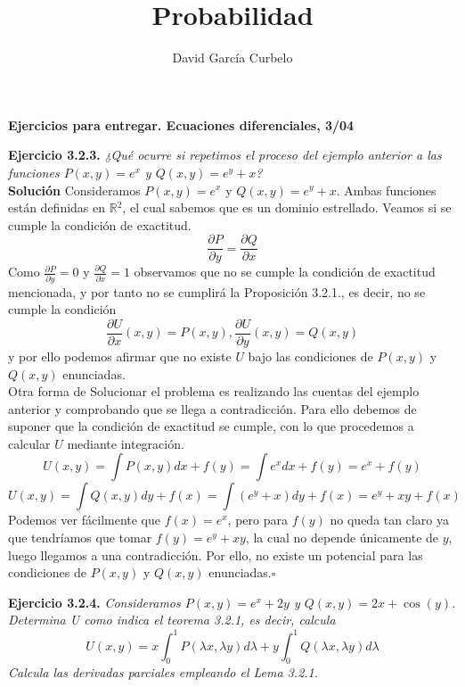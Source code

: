 \documentclass[fleqn]{article}
\author{David García Curbelo}
\title{Probabilidad}
\newcommand*{\QED}{\hfill\ensuremath{\square}}
\def\R{$\mathds{R}$}
\def\sup{$^2$}
\begin{document}
    \begin{center}
        {\large\bf{Ejercicios para entregar. Ecuaciones diferenciales, 3/04}} \\
        
    \end{center}
    
    {\bf{Ejercicio 3.2.3.}} \textit{¿Qué ocurre si repetimos el proceso del ejemplo anterior a las funciones $P(x,y)=e^x$ y $Q(x,y)=e^y + x $?}\\
    
    {\bf{Solución}}  Consideramos $P(x,y)=e^x$ y $Q(x,y)=e^y + x $. Ambas funciones están definidas en \R\sup, el cual sabemos que es un dominio estrellado.
    Veamos si se cumple la condición de exactitud.
    $$\frac{\partial P}{\partial y}=\frac{\partial Q}{\partial x}$$
    Como $\frac{\partial P}{\partial y}=0$ y $\frac{\partial Q}{\partial x}=1$ observamos que no se cumple la condición de exactitud mencionada, 
    y por tanto no se cumplirá la Proposición 3.2.1., es decir, no se cumple la condición
    $$\frac{\partial U}{\partial x}(x,y)=P(x,y), \frac{\partial U}{\partial y}(x,y)=Q(x,y)$$
    y por ello podemos afirmar que no existe $U$ bajo las condiciones de $P(x,y)$ y $Q(x,y)$ enunciadas.\\
    
    Otra forma de Solucionar el problema es realizando las cuentas del ejemplo anterior y comprobando que se llega a contradicción. Para ello debemos de suponer
    que la condición de exactitud se cumple, con lo que procedemos a calcular $U$ mediante integración.
    $$U(x,y)=\int P(x,y) dx + f(y) = \int e^x dx + f(y) = e^x + f(y)$$
    $$U(x,y)=\int Q(x,y) dy + f(x) = \int (e^y + x)dy + f(x) = e^y + xy + f(x)$$
    Podemos ver fácilmente que $f(x)=e^x$, pero para $f(y)$ no queda tan claro ya que tendríamos que tomar $f(y)=e^y + xy$, la cual no depende únicamente de $y$,
    luego llegamos a una contradicción. Por ello, no existe un potencial para las condiciones de $P(x,y)$ y $Q(x,y)$ enunciadas.\QED

    \newpage
    {\bf{Ejercicio 3.2.4.}} \textit{Consideramos $P(x,y)=e^x + 2y$ y $Q(x,y)=2x + \cos(y) $. Determina U como indica el teorema 3.2.1, es decir, calcula
    $$U(x,y)=x\int _{0}^{1} P(\lambda x, \lambda y) d\lambda + y\int _{0}^{1} Q(\lambda x, \lambda y) d\lambda $$
    Calcula las derivadas parciales empleando el Lema 3.2.1.}\\
\end{document}
